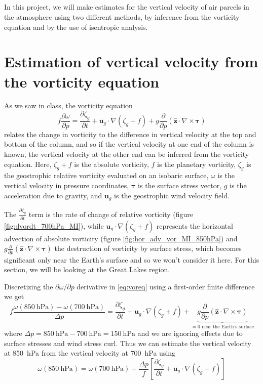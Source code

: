 \documentclass[11pt]{article}
\title{\spacedlowsmallcaps{\small 12.818: Introduction to Atmospheric Data and Large-scale Dynamics}\\ \spacedlowsmallcaps{\Large Project eight: Estimation of vertical velocity}}
\author{\spacedlowsmallcaps{Ali Ramadhan}}
\date{}
\newcommand\p[2]{\frac{\partial #1}{\partial #2}}
\begin{document}
\maketitle

In this project, we will make estimates for the vertical velocity of air parcels in the atmosphere using two different methods, by inference from the vorticity equation and by the use of isentropic analysis.

\section{Estimation of vertical velocity from the vorticity equation}
As we saw in class, the vorticity equation
\begin{equation} \label{eq:voreq}
  f \p{\omega}{p} = \p{\zeta_g}{t} + \bm{u}_g \cdot \nabla (\zeta_g + f) + g \p{}{p} (\hat{\bm{z}} \cdot \nabla \times \bm{\tau})
\end{equation}
relates the change in vorticity to the difference in vertical velocity at the top and bottom of the column, and so if the vertical velocity at one end of the column is known, the vertical velocity at the other end can be inferred from the vorticity equation. Here, $\zeta_g + f$ is the absolute vorticity, $f$ is the planetary vorticity, $\zeta_g$ is the geostrophic relative vorticity evaluated on an isobaric surface, $\omega$ is the vertical velocity in pressure coordinates, $\bm{\tau}$ is the surface stress vector, $g$ is the acceleration due to gravity, and $\bm{u}_g$ is the geostrophic wind velocity field.

The $\p{\zeta_g}{t}$ term is the rate of change of relative vorticity (figure \ref{fig:dvordt_700hPa_MI}), while $\bm{u}_g \cdot \nabla (\zeta_g + f)$ represents the horizontal advection of absolute vorticity (figure \ref{fig:hor_adv_vor_MI_850hPa}) and $g \p{}{p} (\hat{\bm{z}} \cdot \nabla \times \bm{\tau})$ the destruction of vorticity by surface stress, which becomes significant only near the Earth's surface and so we won't consider it here. For this section, we will be looking at the Great Lakes region.

Discretizing the $\partial \omega / \partial p$ derivative in \eqref{eq:voreq} using a first-order finite difference we get
\begin{equation*}
f \frac{\omega(\SI{850}{\hecto\Pa}) - \omega(\SI{700}{\hecto\Pa})}{\Delta p} = \p{\zeta_g}{t} + \bm{u}_g \cdot \nabla (\zeta_g + f) + \underbrace{g \p{}{p} (\hat{\bm{z}} \cdot \nabla \times \bm{\tau})}_\text{$=0$ near the Earth's surface}
\end{equation*}
where $\Delta p = \SI{850}{\hecto\Pa} - \SI{700}{\hecto\Pa} = \SI{150}{\hecto\Pa}$ and we are ignoring effects due to surface stresses and wind stress curl. Thus we can estimate the vertical velocity at \SI{850}{\hecto\Pa} from the vertical velocity at \SI{700}{\hecto\Pa} using
\begin{equation*}
\omega(\SI{850}{\hecto\Pa}) = \omega(\SI{700}{\hecto\Pa}) + \frac{\Delta p}{f} \left[ \p{\zeta_g}{t} + \bm{u}_g \cdot \nabla (\zeta_g + f) \right]
\end{equation*}
\end{document}
